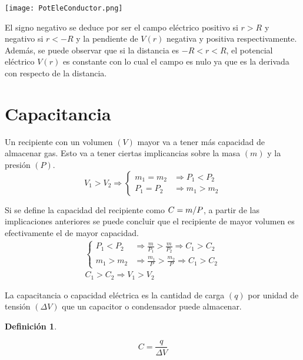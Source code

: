 \documentclass[a5paper,12pt,twoside]{book}
\newtheorem{defn}{{Definición}}[chapter]
\begin{document}
\begin{center}
    \texttt{[image: PotEleConductor.png]}
\end{center}

El signo negativo se deduce por ser el campo eléctrico positivo si $r>R$ y negativo si $r<-R$ y la pendiente de $V(r)$ negativa y positiva respectivamente. Además, se puede observar que si la distancia es $-R<r<R$, el potencial eléctrico $V(r)$ es constante con lo cual el campo es nulo ya que es la derivada con respecto de la distancia.


\section{Capacitancia}

Un recipiente con un volumen $(V)$ mayor va a tener más capacidad de almacenar gas. Esto va a tener ciertas implicancias sobre la masa $(m)$ y la presión $(P)$.
\begin{equation*}
    V_1 > V_2 \Rightarrow
    \left\{
    \begin{aligned}
        m_1 = m_2 & \Rightarrow P_1 < P_2
        \\
        P_1 = P_2 & \Rightarrow m_1 > m_2
    \end{aligned}
    \right.
\end{equation*}

Si se define la capacidad del recipiente como $C= m/P$, a partir de las implicaciones anteriores se puede concluir que el recipiente de mayor volumen es efectivamente el de mayor capacidad.
\begin{gather*}
    \left\{
    \begin{aligned}
        P_1 < P_2 & \Rightarrow \frac{m}{P_1} > \frac{m}{P_2} \Rightarrow C_1 > C_2
        \\[1ex]
        m_1 > m_2 & \Rightarrow \frac{m_1}{P} > \frac{m_2}{P} \Rightarrow C_1 > C_2
    \end{aligned}
    \right.
    \\[1em]
    C_1 > C_2 \Rightarrow V_1 > V_2
\end{gather*}

La capacitancia o capacidad eléctrica es la cantidad de carga $(q)$ por unidad de tensión $(\Delta V)$ que un capacitor o condensador puede almacenar.

\begin{mdframed}[style=MyFrame1]
    \begin{defn}
    \end{defn}
    \begin{equation*}
        C = \frac{q}{\Delta V}
    \end{equation*}
\end{mdframed}
\end{document}
